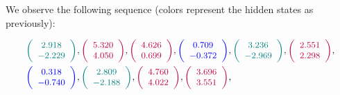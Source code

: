 \documentclass[shortabstract]{iithesis}
\begin{document}



We observe the following sequence (colors represent the hidden states as previously):

\begin{equation*}
    \small
    \begin{aligned}
        &\textcolor{teal}{\left(\begin{array}{c} 2.918\\-2.229\end{array}\right)},
        \textcolor{purple}{\left(\begin{array}{c} 5.320\\4.050\end{array}\right)},
        \textcolor{purple}{\left(\begin{array}{c} 4.626\\0.699\end{array}\right)},
        \textcolor{blue}{\left(\begin{array}{c} 0.709\\-0.372\end{array}\right)},
        \textcolor{teal}{\left(\begin{array}{c} 3.236\\-2.969\end{array}\right)},
        \textcolor{purple}{\left(\begin{array}{c} 2.551\\2.298\end{array}\right)}, \\
        &\textcolor{blue}{\left(\begin{array}{c} 0.318\\-0.740\end{array}\right)},
        \textcolor{teal}{\left(\begin{array}{c} 2.809\\-2.188\end{array}\right)},
        \textcolor{purple}{\left(\begin{array}{c} 4.760\\4.022\end{array}\right)},
        \textcolor{purple}{\left(\begin{array}{c} 3.696\\3.551\end{array}\right)},

\end{aligned}
\end{equation*}
\end{document}
